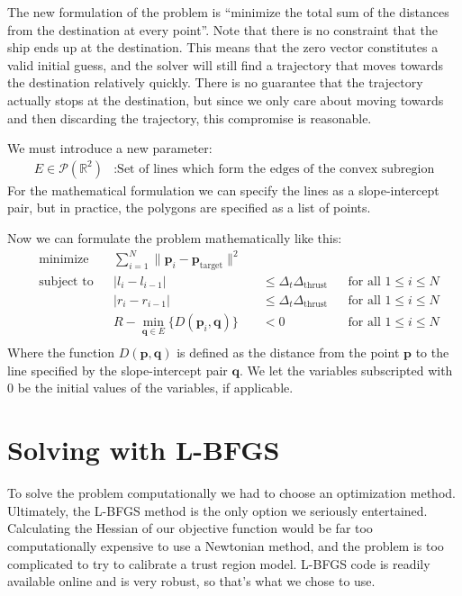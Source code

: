 \documentclass{report}
\begin{document}
The new formulation of the problem is ``minimize the total sum of the distances from the destination at
every point''. Note that there is no constraint that the ship ends up at the destination. This means that the
zero vector constitutes a valid initial guess, and the solver will still find a trajectory that moves towards the
destination relatively quickly. There is no guarantee that the trajectory actually stops at the destination, but
since we only care about moving towards and then discarding the trajectory, this compromise is reasonable.

We must introduce a new parameter:
\begin{align*}
    E \in \mathcal{P}(\mathbb{R}^2) &: \text{Set of lines which form the edges of the convex subregion}
\end{align*}
For the mathematical formulation we can specify the lines as a slope-intercept pair, but in practice, the polygons
are specified as a list of points.

Now we can formulate the problem mathematically like this:
\begin{equation*}
\begin{aligned}
& \text{minimize}
& & \sum_{i=1}^N \| \mathbf{p}_i - \mathbf{p}_\text{target} \|^2\\
& \text{subject to}
&& \lvert l_{i} - l_{i-1} \rvert &&\leq \Delta_t \Delta_\text{thrust} && \text{for all $1 \leq i \leq N$} \\
& && \lvert r_{i} - r_{i-1} \rvert &&\leq \Delta_t \Delta_\text{thrust} && \text{for all $1 \leq i \leq N$} \\
& && R - \min_{\mathbf{q} \in E} \{ D(\mathbf{p}_i, \mathbf{q}) \} &&< 0 && \text{for all $1 \leq i \leq N$} \\
\end{aligned}
\end{equation*}
Where the function $D(\mathbf{p}, \mathbf{q})$ is defined as the distance from the point $\mathbf{p}$ to the line
specified by the slope-intercept pair $\mathbf{q}$. We let the variables subscripted with $0$ be the initial
values of the variables, if applicable.

\section{Solving with L-BFGS}
To solve the problem computationally we had to choose an optimization method. Ultimately, the L-BFGS method is
the only option we seriously entertained. Calculating the Hessian of our objective function would be far too 
computationally expensive to use a Newtonian method, and the problem is too complicated to try to calibrate a
trust region model. L-BFGS code is readily available online and is very robust, so that's what we chose to use.
\end{document}
